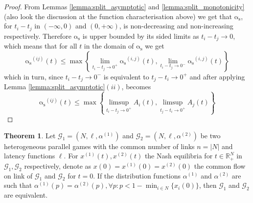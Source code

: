 \documentclass[10pt,a4paper]{book}
\newcommand{\as}{\mathrm{\alpha_s}}
\newcommand{\R}{\mathbb{R}}
\newcommand{\Gm}{\mathcal{G}}
\theoremstyle{definition}
\newtheorem{theorem}[definition]{Theorem}
\theoremstyle{comment}
\begin{document}
\begin{proof}
	 From Lemmas \ref{lemma:split_asymptotic} and \ref{lemma:split_monotonicity} (also look the discussion at the function characterisation above) we get that $\as$, for $t_i - t_j$ in $(-\infty, 0)$ and $(0, +\infty)$, is non-decreasing and non-increasing respectively.
	 Therefore $\as$ is upper bounded by its sided limits as $t_i - t_j \rightarrow 0$, which means that for all $t$ in the domain of $\as$ we get
	 \[\as^{(i j)}(t) \le \max\left\{\lim_{t_i - t_j \rightarrow 0^+} \as^{(i, j)}(t), \lim_{t_i - t_j \rightarrow 0^-} \as^{(i, j)}(t)\right\}\]
	 which in turn, since $t_i - t_j \rightarrow 0^-$ is equivalent to $t_j - t_i \rightarrow 0^+$ and after applying Lemma \ref{lemma:split_asymptotic}$(ii)$, becomes
	 \[\as^{(i j)}(t) \le \max\left\{\limsup_{t_i - t_j \rightarrow 0^+} A_i(t), \limsup_{t_j - t_i \rightarrow 0^+} A_j(t)\right\}\]
\end{proof}

\begin{theorem}
	\label{theorem:alpha_upper_irrelevant}
	Let $\Gm_1 = (N, \ell, \alpha^{(1)})$ and $\Gm_2 = (N, \ell, \alpha^{(2)})$ be two heterogeneous parallel games with the common number of links $n = |N|$  and latency functions $\ell$.
	For $x^{(1)}(t), x^{(2)}(t)$ the Nash equilibria for $t \in \R_+^N$ in $\Gm_1, \Gm_2$ respectively, denote as $x(0) = x^{(1)}(0) = x^{(2)}(0)$ the common flow on link of $\Gm_1$ and $\Gm_2$ for $t = 0$.
	If the distribution functions $\alpha^{(1)}$ and $\alpha^{(2)}$ are such that $\alpha^{(1)}(p) = \alpha^{(2)}(p), \forall p: p < 1 - \min_{i \in N}\{x_i(0)\}$, then $\Gm_1$ and $\Gm_2$ are equivalent.
\end{theorem}
\end{document}

